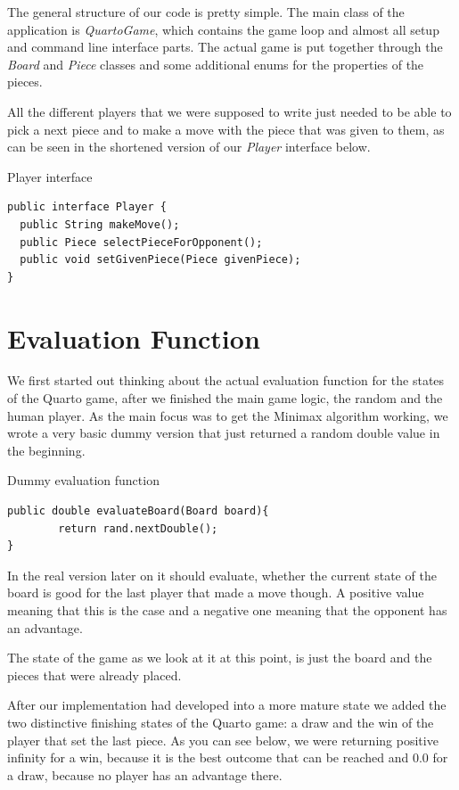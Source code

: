 \documentclass{scrartcl}
\begin{document}
The general structure of our code is pretty simple. The main class of the application is \textit{QuartoGame}, which contains the game loop and almost all setup and command line interface parts. The actual game is put together through the \textit{Board} and \textit{Piece} classes and some additional enums for the properties of the pieces.

All the different players that we were supposed to write just needed to be able to pick a next piece and to make a move with the piece that was given to them, as can be seen in the shortened version of our \textit{Player} interface below.

\begin{listing}[H]
\caption{Player interface}
\begin{verbatim}
public interface Player {
  public String makeMove();
  public Piece selectPieceForOpponent();
  public void setGivenPiece(Piece givenPiece);
}
\end{verbatim}
\end{listing}

\section{Evaluation Function}

We first started out thinking about the actual evaluation function for the states of the Quarto game, after we finished the main game logic, the random and the human player. As the main focus was to get the Minimax algorithm working, we wrote a very basic dummy version that just returned a random double value in the beginning.

\begin{listing}[H]
\caption{Dummy evaluation function}
\begin{verbatim}
public double evaluateBoard(Board board){
        return rand.nextDouble();
}
\end{verbatim}
\end{listing}

In the real version later on it should evaluate, whether the current state of the board is good for the last player that made a move though. A positive value meaning that this is the case and a negative one meaning that the opponent has an advantage.

The state of the game as we look at it at this point, is just the board and the pieces that were already placed.

After our implementation had developed into a more mature state we added the two distinctive finishing states of the Quarto game: a draw and the win of the player that set the last piece. As you can see below, we were returning positive infinity for a win, because it is the best outcome that can be reached and 0.0 for a draw, because no player has an advantage there.
\end{document}
